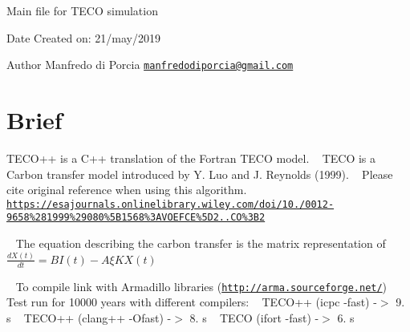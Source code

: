Main file for T\+E\+CO simulation\begin{DoxyDate}{Date}
Created on\+: 21/may/2019 
\end{DoxyDate}
\begin{DoxyAuthor}{Author}
Manfredo di Porcia \href{mailto:manfredodiporcia@gmail.com}{\tt manfredodiporcia@gmail.\+com}
\end{DoxyAuthor}
\hypertarget{index_Brief}{}\section{Brief}\label{index_Brief}
T\+E\+C\+O++ is a C++ translation of the Fortran T\+E\+CO model. ~\newline
T\+E\+CO is a Carbon transfer model introduced by Y. Luo and J. Reynolds (1999). ~\newline
Please cite original reference when using this algorithm. ~\newline
\href{https://esajournals.onlinelibrary.wiley.com/doi/10.1890/0012-9658%281999%29080%5B1568%3AVOEFCE%5D2.0.CO%3B2}{\tt https\+://esajournals.\+onlinelibrary.\+wiley.\+com/doi/10.\+1890/0012-\/9658\%281999\%29080\%5\+B1568\%3\+A\+V\+O\+E\+F\+C\+E\%5\+D2.\+0.\+C\+O\%3\+B2}

~\newline
 The equation describing the carbon transfer is the matrix representation of ~\newline
~\newline
 $ \frac{dX(t)}{dt} = BI(t) - A \xi KX(t) $

~\newline
 To compile link with Armadillo libraries (\href{http://arma.sourceforge.net/}{\tt http\+://arma.\+sourceforge.\+net/}) ~\newline
~\newline
 Test run for 10000 years with different compilers\+: ~\newline
T\+E\+C\+O++ (icpc -\/fast) -\/$>$ 9. s ~\newline
T\+E\+C\+O++ (clang++ -\/\+Ofast) -\/$>$ 8. s ~\newline
T\+E\+CO (ifort -\/fast) -\/$>$ 6. s ~\newline
